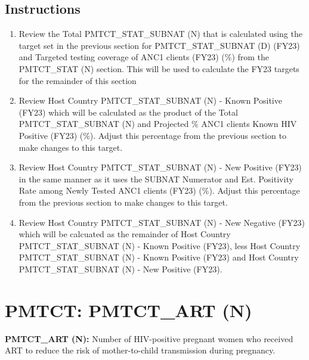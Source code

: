 \documentclass[
  openany]{book}
\begin{document}
\hypertarget{instructions-17}{%
\subsection{Instructions}\label{instructions-17}}

\begin{enumerate}
\def\labelenumi{\arabic{enumi}.}
\item
  Review the Total PMTCT\_STAT\_SUBNAT (N) that is calculated using the
  target set in the previous section for PMTCT\_STAT\_SUBNAT (D) (FY23)
  and Targeted testing coverage of ANC1 clients (FY23) (\%) from the
  PMTCT\_STAT (N) section. This will be used to calculate the FY23
  targets for the remainder of this section
\item
  Review Host Country PMTCT\_STAT\_SUBNAT (N) - Known Positive (FY23)
  which will be calculated as the product of the Total
  PMTCT\_STAT\_SUBNAT (N) and Projected \% ANC1 clients Known HIV
  Positive (FY23) (\%). Adjust this percentage from the previous
  section to make changes to this target.
\item
  Review Host Country PMTCT\_STAT\_SUBNAT (N) - New Positive (FY23) in
  the same manner as it uses the SUBNAT Numerator and Est. Positivity
  Rate among Newly Tested ANC1 clients (FY23) (\%). Adjust this
  percentage from the previous section to make changes to this target.
\item
  Review Host Country PMTCT\_STAT\_SUBNAT (N) - New Negative (FY23)
  which will be calcuated as the remainder of Host Country
  PMTCT\_STAT\_SUBNAT (N) - Known Positive (FY23), less Host Country
  PMTCT\_STAT\_SUBNAT (N) - Known Positive (FY23) and Host Country
  PMTCT\_STAT\_SUBNAT (N) - New Positive (FY23).
\end{enumerate}

\hypertarget{pmtct-pmtct_art-n}{%
\section{PMTCT: PMTCT\_ART (N)}\label{pmtct-pmtct_art-n}}

\textbf{PMTCT\_ART (N):} Number of HIV-positive pregnant women who received
ART to reduce the risk of mother-to-child transmission during pregnancy.
\end{document}
